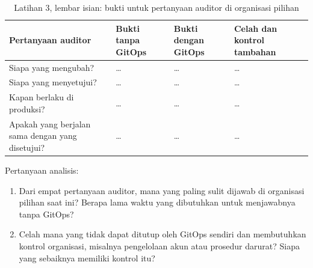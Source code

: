 \begin{table}[!htb]
  \centering
  \caption{Latihan 3, lembar isian: bukti untuk pertanyaan auditor di organisasi pilihan}
  \label{tab:ch13-lat3-hasil}
  \footnotesize
  \begin{tabularx}{\textwidth}{>{\raggedright\arraybackslash}p{2.4cm} >{\raggedright\arraybackslash}X >{\raggedright\arraybackslash}X >{\raggedright\arraybackslash}X}
    \hline
    \textbf{Pertanyaan auditor} & \textbf{Bukti tanpa GitOps} & \textbf{Bukti dengan GitOps} &
      \textbf{Celah dan kontrol tambahan} \\ \hline
    Siapa yang mengubah? & \dots & \dots & \dots \\ \hline
    Siapa yang menyetujui? & \dots & \dots & \dots \\ \hline
    Kapan berlaku di produksi? & \dots & \dots & \dots \\ \hline
    Apakah yang berjalan sama dengan yang disetujui? & \dots & \dots & \dots \\ \hline
  \end{tabularx}
\end{table}

Pertanyaan analisis:
\begin{enumerate}
  \item Dari empat pertanyaan auditor, mana yang paling sulit dijawab di organisasi pilihan saat
        ini? Berapa lama waktu yang dibutuhkan untuk menjawabnya tanpa GitOps?
  \item Celah mana yang tidak dapat ditutup oleh GitOps sendiri dan membutuhkan kontrol
        organisasi, misalnya pengelolaan akun atau prosedur darurat? Siapa yang sebaiknya
        memiliki kontrol itu?
\end{enumerate}
